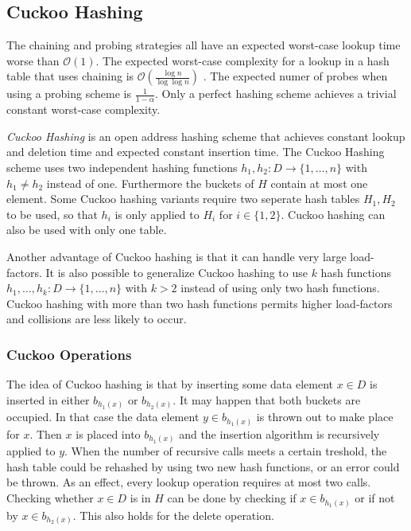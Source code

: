 \subsection{Cuckoo Hashing}
The chaining and probing strategies all have an expected worst-case lookup time worse than $\mathcal{O}(1)$. The expected worst-case complexity for a lookup in a hash table that uses chaining is $\mathcal{O}(\frac{\log n}{\log \log n})$ \cite{Gonnet:1981:ELL:322248.322254}. The expected numer of probes when using a probing scheme is $\frac{1}{1 - \alpha}$. Only a perfect hashing scheme achieves a trivial constant worst-case complexity.

\emph{Cuckoo Hashing} \cite{Pagh01cuckoohashing, Pagh:2004:CH:1006424.1006426} is an open address hashing scheme that achieves constant lookup and deletion time and expected constant insertion time. The Cuckoo Hashing scheme uses two independent hashing functions $h_1, h_2 : D \rightarrow \{ 1, \dots, n \}$ with $h_1 \not = h_2$ instead of one. Furthermore the buckets of $H$ contain at most one element. Some Cuckoo hashing variants require two seperate hash tables $H_1, H_2$ to be used, so that $h_i$ is only applied to $H_i$ for $i \in \{ 1, 2 \}$. Cuckoo hashing can also be used with only one table. 

Another advantage of Cuckoo hashing is that it can handle very large load-factors. It is also possible to generalize Cuckoo hashing to use $k$ hash functions $h_1, \dots, h_k : D \rightarrow \{ 1, \dots, n \}$ with $k > 2$ instead of using only two hash functions. Cuckoo hashing with more than two hash functions permits higher load-factors and collisions are less likely to occur.

\subsubsection{Cuckoo Operations}
The idea of Cuckoo hashing is that by inserting some data element $x \in D$ is inserted in either $b_{h_1(x)}$ or $b_{h_2(x)}$. It may happen that both buckets are occupied. In that case the data element $y \in b_{h_1(x)}$ is thrown out to make place for $x$. Then $x$ is placed into $b_{h_1(x)}$ and the insertion algorithm is recursively applied to $y$. When the number of recursive calls meets a certain treshold, the hash table could be rehashed by using two new hash functions, or an error could be thrown. As an effect, every lookup operation requires at most two calls. Checking whether $x \in D$ is in $H$ can be done by checking if $x \in b_{h_1(x)}$ or if not by $x \in b_{h_2(x)}$. This also holds for the delete operation.

